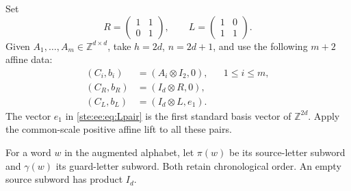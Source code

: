 \documentclass[11pt,letterpaper]{article}
\theoremstyle{definition}
\theoremstyle{remark}
\newcommand{\Z}{\mathbb Z}
\begin{document}
Set
\begin{equation}
 R=\begin{pmatrix}1&1\\0&1\end{pmatrix},\qquad
 L=\begin{pmatrix}1&0\\1&1\end{pmatrix}.
 \label{ste:ee:eq:guards}
\end{equation}
Given $A_1,\ldots,A_m\in\Z^{d\times d}$, take $h=2d$, $n=2d+1$, and use the
following $m+2$ affine data:
\begin{align}
 (C_i,b_i)&=(A_i\otimes I_2,0), &&1\leq i\leq m,\label{ste:ee:eq:sourcepairs}\\
 (C_R,b_R)&=(I_d\otimes R,0),\label{ste:ee:eq:Rpair}\\
 (C_L,b_L)&=(I_d\otimes L,e_1).\label{ste:ee:eq:Lpair}
\end{align}
The vector $e_1$ in \eqref{ste:ee:eq:Lpair} is the first standard basis vector of
$\Z^{2d}$. Apply the common-scale positive affine lift to all these pairs.

For a word $w$ in the augmented alphabet, let $\pi(w)$ be its source-letter
subword and $\gamma(w)$ its guard-letter subword. Both retain chronological
order. An empty source subword has product $I_d$.
\end{document}
